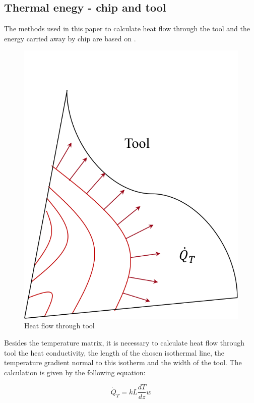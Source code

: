 	\subsection{Thermal enegy - chip and tool}
	The methods used in this paper to calculate heat flow through the tool and the energy carried away by chip are based on \cite{boothroyd1963temperatures}.

	\begin{figure}[H]
		\centering
		\captionsetup{justification=centering}
		\includegraphics[scale=0.6]{Cap4/ToolHeat.png}
		\caption{Heat flow through tool}
		\label{fig:heattool}
	\end{figure}

	Besides the temperature matrix, it is necessary to calculate heat flow through tool the heat conductivity, the length of the chosen isothermal line, the temperature gradient normal to this isotherm and the width of the tool. The calculation is given by the following equation:

	\begin{equation} 
	\label{eq_heattool}
		\dot{Q}_{T} = kL\frac{dT}{dz}w
	\end{equation}

